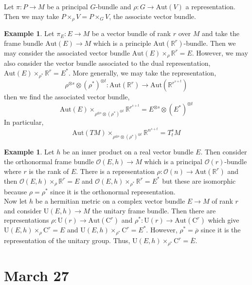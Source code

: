\documentclass[12pt]{extarticle}
\newcommand{\R}{\mathbb{R}}
\theoremstyle{definition}
\newtheorem{example}[theorem]{Example}
\newenvironment{definition}[1][Definition:]{\begin{trivlist}
\item[\hskip \labelsep {\bfseries #1}]}{\end{trivlist}}
\newcommand{\C}[1]{\mathcal{C}^{#1}}
\renewcommand{\O}{\mathcal{O}}
\newcommand{\U}[1]{\mathrm{U}\left(#1\right)}
\begin{document}
\newcommand{\Aut}[1]{\mathrm{Aut}\left( #1 \right)}

\begin{definition}
Let $\pi : P \to M$ be a principal $G$-bundle and $\rho : G \to \Aut{V}$ a representation. Then we may take $P \times_\rho V = P \times_G V$, the associate vector bundle. 
\end{definition}

\begin{example}
Let $\pi_E : E \to M$ be a vector bundle of rank $r$ over $M$ and take the frame bundle $\Aut{E} \to M$ which is a principle $\Aut{\R^r}$-bundle. Then we may consider the associated vector bundle $\Aut{E} \times_\rho \R^r = E$. However, we may also consider the vector bundle associated to the dual representation, $\Aut{E} \times_{\rho^*} \R^r = E^*$. More generally, we may take the representation,
\[ \rho^{\otimes s} \otimes (\rho^*)^{\otimes t} : \Aut{\R^r} \to \Aut{\R^{r^{s+t}}} \]
then we find the associated vector bundle,
\[ \Aut{E} \times_{\rho^{\otimes s} \otimes (\rho^*)^{\otimes t}} \R^{r^{s + t}} = E^{\otimes s} \otimes (E^*)^{\otimes t} \]
In particular, 
\[ \Aut{TM} \times_{\rho^{\otimes s} \otimes (\rho^*)^{\otimes t}} \R^{n^{s + t}} = T^s_t M \]
\end{example}

\renewcommand{\U}{\mathrm{U}}
\renewcommand{\C}{\mathrm{C}}

\begin{example}
Let $h$ be an inner product on a real vector bundle $E$. Then consider the orthonormal frame bundle $\O(E, h) \to M$ which is a principal $\O(r)$-bundle where $r$ is the rank of $E$. There is a representation $\rho : \O(n) \to \Aut{\R^r}$ and then $\O(E, h) \times_\rho \R^r = E$ and $\O(E, h) \times_{\rho^*} \R^r = E^*$ but these are isomorphic because $\rho = \rho^*$ since it is the orthonormal representation.
\bigskip\\
Now let $h$ be a hermitian metric on a complex vector bundle $E \to M$ of rank $r$ and consider $\U(E, h) \to M$ the unitary frame bundle. Then there are representations $\rho : \U(r) \to \Aut{\C^r}$ and $\rho^* : \U(r) \to \Aut{\C^r}$ which give $\U(E, h) \times_\rho \C^r = E$ and $\U(E, h) \times_{\rho^*} \C^r = E^*$. However, $\rho^* = \overline{\rho}$ since it is the representation of the unitary group. Thus, $\U(E, h) \times_{\rho^*} \C^r = \overline{E}$. 
\end{example}

\section{March 27}
\end{document}
